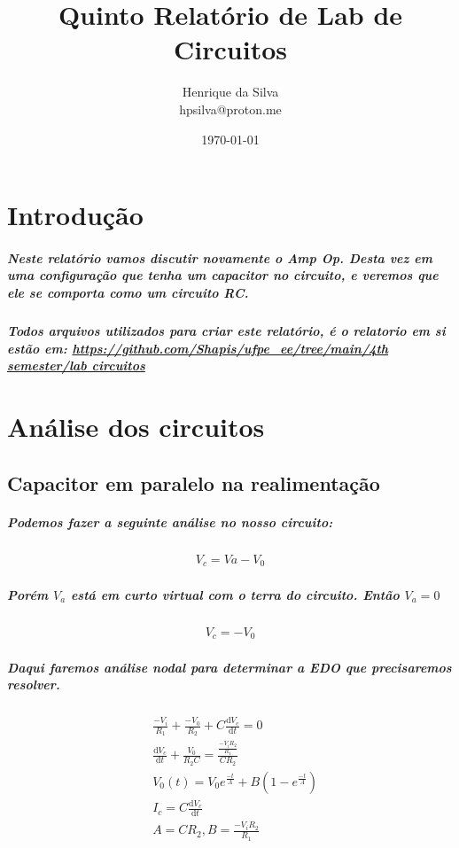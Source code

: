 \documentclass[12pt,twoside, a4paper, twocolumn]{article}
\title{Quinto Relatório de Lab de Circuitos}
\author{Henrique da Silva \\ hpsilva@proton.me}
\date{\today}
\newcommand\deriv[2]{\frac{\mathrm d #1}{\mathrm d #2}}
\begin{document}
\maketitle
{}
\newpage
\tableofcontents
\newpage



\section{Introdução}

\subparagraph*{Neste relatório vamos discutir novamente o Amp Op. Desta vez em uma configuração que tenha um capacitor no circuito, e veremos que ele se comporta como um circuito RC.}

\subparagraph*{Todos arquivos utilizados para criar este relatório, é o relatorio em si estão em:  \url{https://github.com/Shapis/ufpe_ee/tree/main/4th semester/lab circuitos}}


\section{Análise dos circuitos}

\subsection*{Capacitor em paralelo na realimentação}

\subparagraph*{Podemos fazer a seguinte análise no nosso circuito:}

\begin{equation}
    \begin{aligned}
        V_c = Va - V_0
    \end{aligned}
\end{equation}

\subparagraph*{Porém $V_a$ está em curto virtual com o terra do circuito. Então $V_a = 0$}

\begin{equation}
    \begin{aligned}
        V_c = - V_0
    \end{aligned}
\end{equation}

\subparagraph*{Daqui faremos análise nodal para determinar a EDO que precisaremos resolver.}

\begin{equation}
    \begin{aligned}
         & \frac{-V_i}{R_1} + \frac{-V_0}{R_2} + C \deriv{V_c}{t} = 0              \\
         & \deriv{V_c}{t} + \frac{V_0}{R_2 C} = \frac{\frac{-V_i R_2}{R_1}}{C R_2} \\
         & V_0(t) = V_0 e^{\frac{-t}{A}} + B(1- e^{\frac{-t}{A}})                  \\
         & I_c = C \deriv{V_c}{t}                                                  \\
         & A = C R_2 , B = \frac{-V_i R_2}{R_1}                                    \\
    \end{aligned}
\end{equation}
\end{document}
